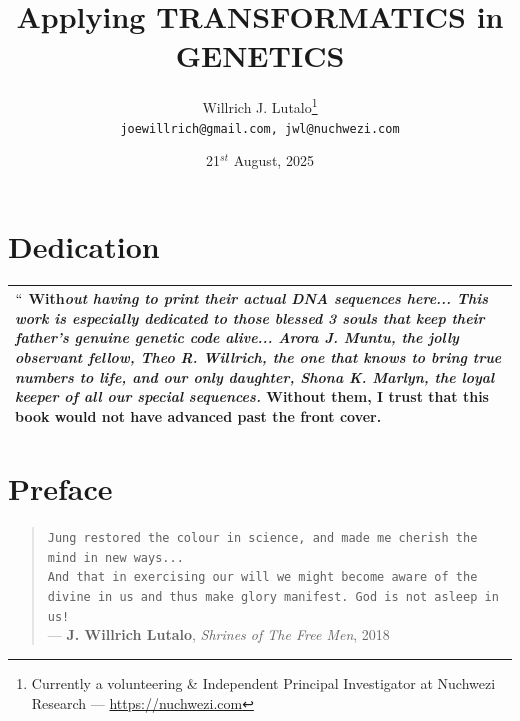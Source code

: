 \documentclass[a4paper, 18pt]{book} %
\title{Applying \textbf{TRANSFORMATICS} in GENETICS}
\author{Willrich J. Lutalo\thanks{Currently a volunteering \& Independent Principal Investigator at Nuchwezi Research --- \url{https://nuchwezi.com}}\\
\texttt{joewillrich@gmail.com, jwl@nuchwezi.com}}
\date{21$^{st}$ August, 2025}
\begin{document}
\frontmatter








\maketitle

\chapter*{Dedication}


\begin{table}[H]
  \centering
  \Huge
	\begin{tabular}[t]{|p{}}
$   ``$ \textbf{With}\textit{out having to print their actual DNA sequences here...    \Large This work is especially dedicated to those blessed 3 souls that keep their father's genuine genetic code alive...  \textbf{Arora J. Muntu}, the jolly observant fellow, \textbf{Theo R. Willrich}, the one that knows to bring true numbers to life, and our only daughter, \textbf{Shona K. Marlyn}, the loyal keeper of all our special sequences.} Without them, I trust that this \textbf{book would not have advanced past the front cover.}\\
	\hline
	              
\end{tabular}
  \label{TABDEDC}
\end{table}

\tableofcontents

\listoffigures

\listoftables

\newpage

\Large


\chapter{Preface}

\begin{quotation}
\noindent \texttt{Jung restored the colour in science, and made me cherish the mind in new ways...}\\
\texttt{And that in exercising our will we might become aware of the divine in us and thus make glory manifest. God is not asleep in us!}\\
\hspace*{\fill} --- \textbf{J. Willrich Lutalo}, \textit{Shrines of The Free Men}, 2018\cite{shrinesjwl}
\end{quotation}
\end{document}
